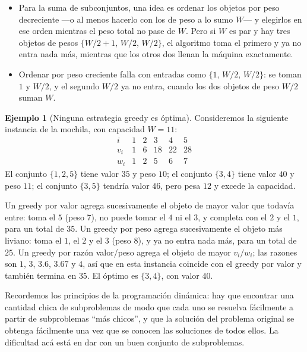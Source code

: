 \documentclass[12pt, spanish, oneside, openany]{book}
\theoremstyle{uprightplain}
\theoremstyle{definition}
\newtheorem{ejemplo}[teorema]{Ejemplo}
\theoremstyle{remark}
\theoremstyle{definition}
\begin{document}
\begin{itemize}
    \item Para la suma de subconjuntos, una idea es ordenar los objetos por peso decreciente ---o al menos hacerlo con los de peso a lo sumo $W$--- y elegirlos en ese orden mientras el peso total no pase de $W$. Pero si $W$ es par y hay tres objetos de pesos $\{W/2+1,\,W/2,\,W/2\}$, el algoritmo toma el primero y ya no entra nada más, mientras que los otros dos llenan la máquina exactamente.
    \item Ordenar por peso creciente falla con entradas como $\{1,\,W/2,\,W/2\}$: se toman $1$ y $W/2$, y el segundo $W/2$ ya no entra, cuando los dos objetos de peso $W/2$ suman $W$.
\end{itemize}

\begin{ejemplo}[Ninguna estrategia greedy es óptima]
\label{ej:dp-mochila-greedy}
Consideremos la siguiente instancia de la mochila, con capacidad $W=11$:
\[
\begin{array}{c|ccccc}
i & 1 & 2 & 3 & 4 & 5\\\hline
v_i & 1 & 6 & 18 & 22 & 28\\
w_i & 1 & 2 & 5 & 6 & 7
\end{array}
\]
El conjunto $\{1,2,5\}$ tiene valor $35$ y peso $10$; el conjunto $\{3,4\}$ tiene valor $40$ y peso $11$; el conjunto $\{3,5\}$ tendría valor $46$, pero pesa $12$ y excede la capacidad.

Un greedy por valor agrega sucesivamente el objeto de mayor valor que todavía entre: toma el $5$ (peso $7$), no puede tomar el $4$ ni el $3$, y completa con el $2$ y el $1$, para un total de $35$. Un greedy por peso agrega sucesivamente el objeto más liviano: toma el $1$, el $2$ y el $3$ (peso $8$), y ya no entra nada más, para un total de $25$. Un greedy por razón valor/peso agrega el objeto de mayor $v_i/w_i$; las razones son $1$, $3$, $3.6$, $3.67$ y $4$, así que en esta instancia coincide con el greedy por valor y también termina en $35$. El óptimo es $\{3,4\}$, con valor $40$.
\end{ejemplo}

Recordemos los principios de la programación dinámica: hay que encontrar una cantidad chica de subproblemas de modo que cada uno se resuelva fácilmente a partir de subproblemas ``más chicos'', y que la solución del problema original se obtenga fácilmente una vez que se conocen las soluciones de todos ellos. La dificultad acá está en dar con un buen conjunto de subproblemas.
\end{document}
